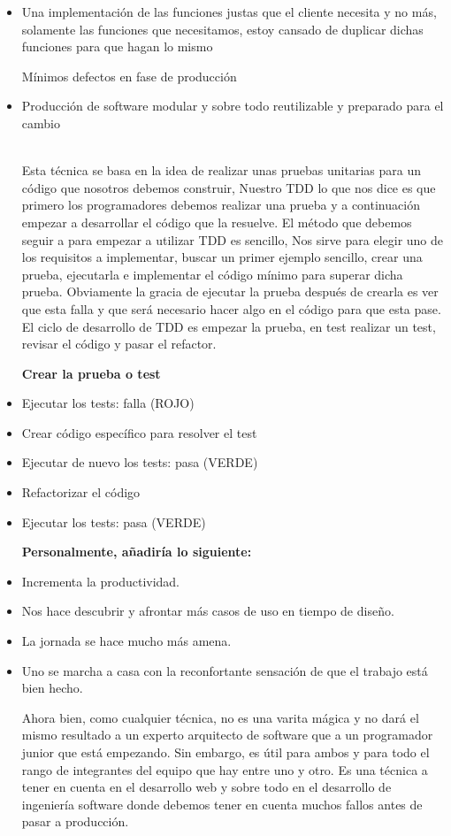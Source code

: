 \begin{flushleft}

\begin{itemize}

	\item Una implementación de las funciones justas que el cliente necesita y no más, solamente las funciones que necesitamos, estoy cansado de duplicar dichas funciones para que hagan lo mismo

	 Mínimos defectos en fase de producción

	\item Producción de software modular y sobre todo reutilizable y preparado para el cambio


\textbf{}\\
Esta técnica se basa en la idea de realizar unas pruebas unitarias para un código que nosotros debemos construir, Nuestro TDD lo que nos dice es que primero los programadores debemos realizar una prueba y a continuación empezar a desarrollar el código que la resuelve.
El método que debemos seguir a para empezar a utilizar TDD es sencillo, Nos sirve para elegir uno de los requisitos a implementar, buscar un primer ejemplo sencillo, crear una prueba, ejecutarla e implementar el código mínimo para superar dicha prueba.
Obviamente la gracia de ejecutar la prueba después de crearla es ver que esta falla y que será necesario hacer algo en el código para que esta pase.
El ciclo de desarrollo de TDD es empezar la prueba, en test realizar un test, revisar el código y pasar el refactor.

\textbf {Crear la prueba o test}
\item Ejecutar los tests: falla (ROJO)
\item Crear código específico para resolver el test
\item Ejecutar de nuevo los tests: pasa (VERDE)
\item Refactorizar el código
\item Ejecutar los tests: pasa (VERDE)

\textbf {Personalmente, añadiría lo siguiente:}
\item Incrementa la productividad.
\item Nos hace descubrir y afrontar más casos de uso en tiempo de diseño.
\item La jornada se hace mucho más amena.
\item Uno se marcha a casa con la reconfortante sensación de que el trabajo está bien hecho.


Ahora bien, como cualquier técnica, no es una varita mágica y no dará el mismo resultado a un experto arquitecto de software que a un programador junior que está empezando. Sin embargo, es útil para ambos y para todo el rango de integrantes del equipo que hay entre uno y otro.
Es una técnica a tener en cuenta en el desarrollo web y sobre todo en el desarrollo de ingeniería software donde debemos tener en cuenta muchos fallos antes de pasar a producción.



\end{itemize} 


\end{flushleft}